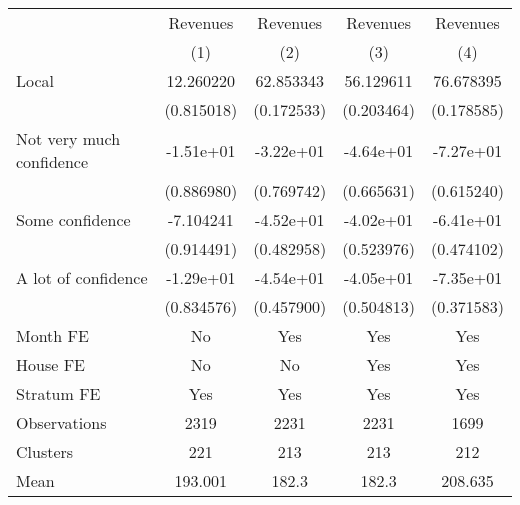 {
\def\sym#1{\ifmmode^{#1}\else\(^{#1}\)\fi}
\begin{tabular}{l*{4}{c}}
\toprule
                &\multicolumn{1}{c}{Revenues}&\multicolumn{1}{c}{Revenues}&\multicolumn{1}{c}{Revenues}&\multicolumn{1}{c}{Revenues}\\
                &\multicolumn{1}{c}{(1)}         &\multicolumn{1}{c}{(2)}         &\multicolumn{1}{c}{(3)}         &\multicolumn{1}{c}{(4)}         \\
\midrule
Local           &12.260220         &62.853343         &56.129611         &76.678395         \\
                &(0.815018)         &(0.172533)         &(0.203464)         &(0.178585)         \\
Not very much confidence&-1.51e+01         &-3.22e+01         &-4.64e+01         &-7.27e+01         \\
                &(0.886980)         &(0.769742)         &(0.665631)         &(0.615240)         \\
Some confidence &-7.104241         &-4.52e+01         &-4.02e+01         &-6.41e+01         \\
                &(0.914491)         &(0.482958)         &(0.523976)         &(0.474102)         \\
A lot of confidence&-1.29e+01         &-4.54e+01         &-4.05e+01         &-7.35e+01         \\
                &(0.834576)         &(0.457900)         &(0.504813)         &(0.371583)         \\
Month FE        &       No         &      Yes         &      Yes         &      Yes         \\
House FE        &       No         &       No         &      Yes         &      Yes         \\
Stratum FE      &      Yes         &      Yes         &      Yes         &      Yes         \\
\midrule
Observations    &     2319         &     2231         &     2231         &     1699         \\
Clusters        &      221         &      213         &      213         &      212         \\
Mean            &  193.001         &    182.3         &    182.3         &  208.635         \\
\bottomrule
\end{tabular}
}
